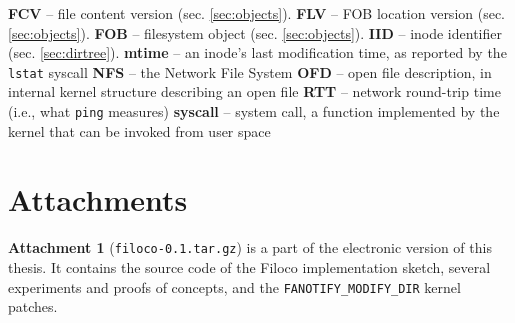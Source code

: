 \documentclass[12pt,a4paper,twoside,openright]{report}
\let\openright=\cleardoublepage
\begin{document}



\tableofcontents







%








\vbox{\noindent\textbf{FCV} -- file content version (sec. \ref{sec:objects}).}
\vbox{\noindent\textbf{FLV} -- FOB location version (sec. \ref{sec:objects}).}
\vbox{\noindent\textbf{FOB} -- filesystem object (sec. \ref{sec:objects}).}
\vbox{\noindent\textbf{IID} -- inode identifier (sec. \ref{sec:dirtree}).}
\vbox{\noindent\textbf{mtime} -- an inode's last modification time, as reported by the \texttt{lstat} syscall}
\vbox{\noindent\textbf{NFS} -- the Network File System \cite{nfs-rfc}}
\vbox{\noindent\textbf{OFD} -- open file description, in internal kernel structure describing an open file}
\vbox{\noindent\textbf{RTT} -- network round-trip time (i.e., what \texttt{ping} measures)}
\vbox{\noindent\textbf{syscall} -- system call, a function implemented by the kernel that can be invoked from user space}

\appendix
\chapter{Attachments}

\textbf{Attachment 1} (\texttt{filoco-0.1.tar.gz}) is a part of the electronic
version of this thesis. It contains the source code of the Filoco implementation
sketch, several experiments and proofs of concepts, and the \texttt{FANOTIFY\_MODIFY\_DIR}
kernel patches.

\openright
\end{document}
